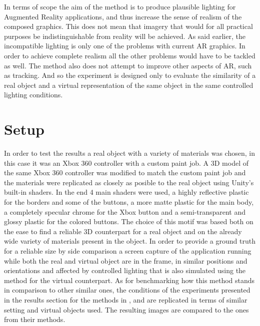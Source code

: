 
 In terms of scope the aim of the method is to produce plausible lighting for Augmented Reality applications, and thus increase the sense of realism of the composed graphics. This does not mean that imagery that would for all practical purposes be indistinguishable from reality will be achieved. As said earlier, the incompatible lighting is only one of the problems with current AR graphics. In order to achieve complete realism all the other problems would have to be tackled as well. The method also does not attempt to improve other aspects of AR, such as tracking. And so the experiment is designed only to evaluate the similarity of a real object and a virtual representation of the same object in the same controlled lighting conditions.\newline
\section{Setup}
In order to test the results a real object with a variety of materials was chosen, in this case it was an Xbox 360 controller with a custom paint job. A 3D model of the same Xbox 360 controller was modified to match the custom paint job and the materials were replicated as closely as posible to the real object using Unity's built-in shaders. In the end 4 main shaders were used, a highly reflective plastic for the borders and some of the buttons, a more matte plastic for the main body, a completely specular chrome for the Xbox button and a semi-transparent and glossy plastic for the colored buttons. The choice of this motif was based both on the ease to find a reliable 3D counterpart for a real object and on the already wide variety of materials present in the object.\newline
In order to provide a ground truth for a reliable size by side comparison a screen capture of the application running while both the real and virtual object are in the frame, in similar positions and orientations and affected by controlled lighting that is also simulated using the method for the virtual counterpart.\newline
As for benchmarking how this method stands in comparison to other similar ones, the conditions of the experiments presented in the results section for the methods in \cite{kanbara2004}, \cite{karsh2014} and \cite{pessoa2011} are replicated in terms of similar setting and virtual objects used. The resulting images are compared to the ones from their methods.\newline
